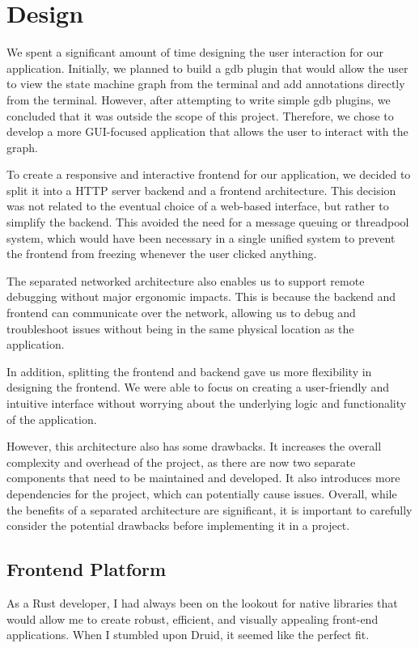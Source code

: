 \chapter{Design}
We spent a significant amount of time designing the user interaction for our application. Initially, we planned to build a gdb plugin that would allow the user to view the state machine graph from the terminal and add annotations directly from the terminal. However, after attempting to write simple gdb plugins, we concluded that it was outside the scope of this project. Therefore, we chose to develop a more GUI-focused application that allows the user to interact with the graph.

To create a responsive and interactive frontend for our application, we decided to split it into a HTTP server backend and a frontend architecture. This decision was not related to the eventual choice of a web-based interface, but rather to simplify the backend. This avoided the need for a message queuing or threadpool system, which would have been necessary in a single unified system to prevent the frontend from freezing whenever the user clicked anything.

The separated networked architecture also enables us to support remote debugging without major ergonomic impacts. This is because the backend and frontend can communicate over the network, allowing us to debug and troubleshoot issues without being in the same physical location as the application.

In addition, splitting the frontend and backend gave us more flexibility in designing the frontend. We were able to focus on creating a user-friendly and intuitive interface without worrying about the underlying logic and functionality of the application.

However, this architecture also has some drawbacks. It increases the overall complexity and overhead of the project, as there are now two separate components that need to be maintained and developed. It also introduces more dependencies for the project, which can potentially cause issues. Overall, while the benefits of a separated architecture are significant, it is important to carefully consider the potential drawbacks before implementing it in a project.

\section{Frontend Platform}
As a Rust developer, I had always been on the lookout for native libraries that would allow me to create robust, efficient, and visually appealing front-end applications. When I stumbled upon Druid, it seemed like the perfect fit.

